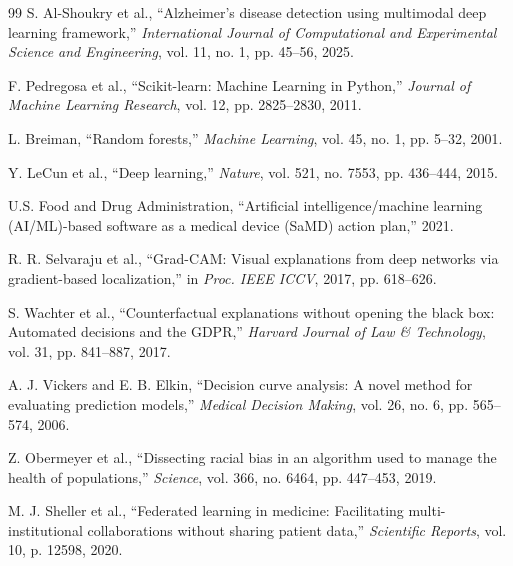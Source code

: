 \documentclass[conference]{IEEEtran}
\begin{document}
\begin{thebibliography}{99}
S. Al-Shoukry et al., ``Alzheimer's disease detection using multimodal deep learning framework,'' \textit{International Journal of Computational and Experimental Science and Engineering}, vol. 11, no. 1, pp. 45--56, 2025.

F. Pedregosa et al., ``Scikit-learn: Machine Learning in Python,'' \textit{Journal of Machine Learning Research}, vol. 12, pp. 2825--2830, 2011.

L. Breiman, ``Random forests,'' \textit{Machine Learning}, vol. 45, no. 1, pp. 5--32, 2001.

Y. LeCun et al., ``Deep learning,'' \textit{Nature}, vol. 521, no. 7553, pp. 436--444, 2015.

U.S. Food and Drug Administration, ``Artificial intelligence/machine learning (AI/ML)-based software as a medical device (SaMD) action plan,'' 2021.

R. R. Selvaraju et al., ``Grad-CAM: Visual explanations from deep networks via gradient-based localization,'' in \textit{Proc. IEEE ICCV}, 2017, pp. 618--626.

S. Wachter et al., ``Counterfactual explanations without opening the black box: Automated decisions and the GDPR,'' \textit{Harvard Journal of Law \& Technology}, vol. 31, pp. 841--887, 2017.

A. J. Vickers and E. B. Elkin, ``Decision curve analysis: A novel method for evaluating prediction models,'' \textit{Medical Decision Making}, vol. 26, no. 6, pp. 565--574, 2006.

Z. Obermeyer et al., ``Dissecting racial bias in an algorithm used to manage the health of populations,'' \textit{Science}, vol. 366, no. 6464, pp. 447--453, 2019.

M. J. Sheller et al., ``Federated learning in medicine: Facilitating multi-institutional collaborations without sharing patient data,'' \textit{Scientific Reports}, vol. 10, p. 12598, 2020.

\end{thebibliography}
\end{document}

